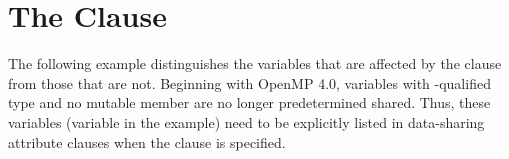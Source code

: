 \pagebreak
\chapter{The  Clause}
\label{chap:default_none}

The following example distinguishes the variables that are affected by the  
clause from those that are not. 
Beginning with OpenMP 4.0, variables with -qualified type and no mutable member 
are no longer predetermined shared.  Thus, these variables (variable  in the example) 
need to be explicitly listed
in data-sharing attribute clauses when the  clause is specified.




